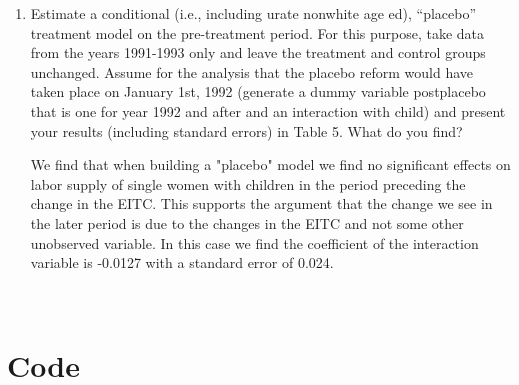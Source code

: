 \documentclass{article}
\begin{document}
\begin{enumerate}[label=\alph*]






\item Estimate a conditional (i.e., including urate nonwhite age ed), “placebo” treatment model on the pre-treatment period. For this purpose, take data from the years 1991-1993 only and leave the treatment and control groups unchanged. Assume for the analysis that the placebo reform would have taken place on January 1st, 1992 (generate a dummy variable postplacebo that is one for year 1992 and after and an interaction with child) and present your results (including standard errors) in Table 5. What do you find?

We find that when building a "placebo" model we find no significant effects on labor supply of single women with children in the period preceding the change in the EITC.  This supports the argument that the change we see in the later period is due to the changes in the EITC and not some other unobserved variable.  In this case we find the coefficient of the interaction variable is -0.0127 with a standard error of 0.024.


​


\end{enumerate}


\section{Code}


\end{document}
